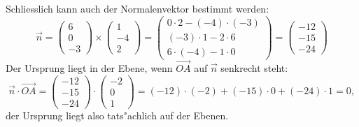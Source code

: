 \begin{loesung}
Schliesslich kann auch der Normalenvektor bestimmt werden:
\[
\vec n=
\begin{pmatrix}
6\\0\\-3
\end{pmatrix}
\times
\begin{pmatrix}
1\\-4\\2
\end{pmatrix}
=\begin{pmatrix}
0\cdot 2-(-4)\cdot(-3)\\
(-3)\cdot 1-2\cdot 6\\
6\cdot(-4)-1\cdot 0
\end{pmatrix}
=
\begin{pmatrix}
-12\\
-15\\
-24
\end{pmatrix}
\]
Der Ursprung liegt in der Ebene, wenn $\overrightarrow{OA}$ auf
$\vec n$ senkrecht steht:
\[
\vec n\cdot\overrightarrow{OA}
=
\begin{pmatrix}
-12\\ -15\\ -24 \end{pmatrix}
\cdot
\begin{pmatrix}
-2\\0\\1
\end{pmatrix}
=(-12)\cdot(-2)+(-15)\cdot 0+(-24)\cdot 1=0,
\]
der Ursprung liegt also tats"achlich auf der Ebenen.
\end{loesung}

